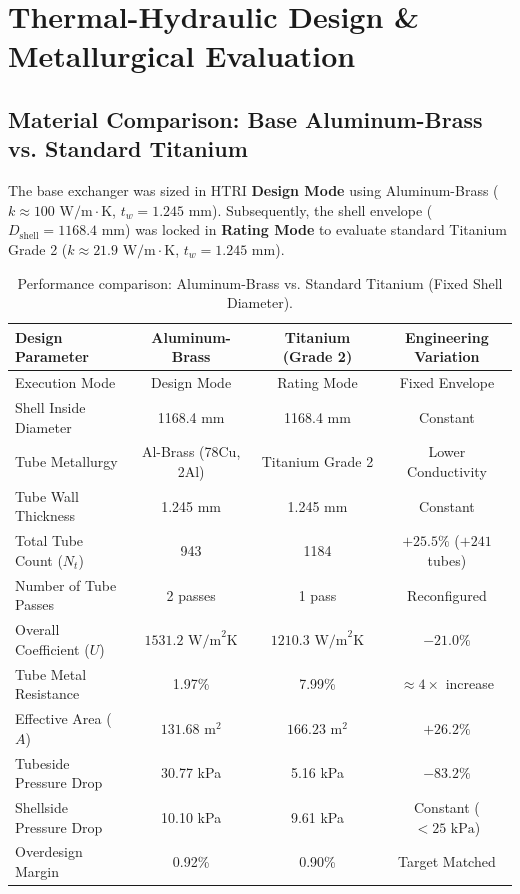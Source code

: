 \documentclass[12pt,a4paper]{article}
\begin{document}
\section{Thermal-Hydraulic Design \& Metallurgical Evaluation}

\subsection{Material Comparison: Base Aluminum-Brass vs. Standard Titanium}

The base exchanger was sized in HTRI \textbf{Design Mode} using Aluminum-Brass ($k \approx 100\text{ W/m}\cdot\text{K}$, $t_w = 1.245\text{ mm}$). Subsequently, the shell envelope ($D_{\text{shell}} = 1168.4\text{ mm}$) was locked in \textbf{Rating Mode} to evaluate standard Titanium Grade 2 ($k \approx 21.9\text{ W/m}\cdot\text{K}$, $t_w = 1.245\text{ mm}$).

\begin{table}[H]
\centering
\small
\caption{Performance comparison: Aluminum-Brass vs. Standard Titanium (Fixed Shell Diameter).}
\label{tab:mat_comp}
\begin{tabular}{lccc}
\toprule
\textbf{Design Parameter} & \textbf{Aluminum-Brass} & \textbf{Titanium (Grade 2)} & \textbf{Engineering Variation} \\
\midrule
Execution Mode & Design Mode & Rating Mode & Fixed Envelope \\
Shell Inside Diameter & 1168.4 mm & 1168.4 mm & Constant \\
Tube Metallurgy & Al-Brass (78Cu, 2Al) & Titanium Grade 2 & Lower Conductivity \\
Tube Wall Thickness & 1.245 mm & 1.245 mm & Constant \\
Total Tube Count ($N_t$) & 943 & 1184 & $+25.5\%$ ($+241$ tubes) \\
Number of Tube Passes & 2 passes & 1 pass & Reconfigured \\
Overall Coefficient ($U$) & $1531.2\text{ W/m}^2\text{K}$ & $1210.3\text{ W/m}^2\text{K}$ & $-21.0\%$ \\
Tube Metal Resistance & 1.97\% & 7.99\% & $\approx 4\times$ increase \\
Effective Area ($A$) & $131.68\text{ m}^2$ & $166.23\text{ m}^2$ & $+26.2\%$ \\
Tubeside Pressure Drop & 30.77 kPa & 5.16 kPa & $-83.2\%$ \\
Shellside Pressure Drop & 10.10 kPa & 9.61 kPa & Constant ($<25\text{ kPa}$) \\
Overdesign Margin & 0.92\% & 0.90\% & Target Matched \\
\bottomrule
\end{tabular}
\end{table}
\end{document}
